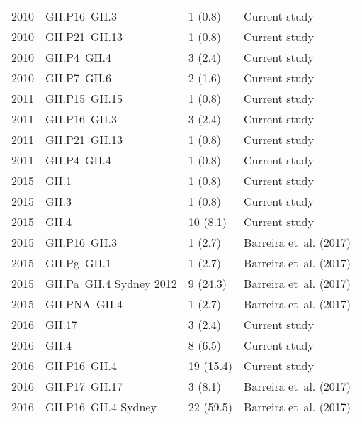 \begin{table}[htbp]
\begin{tabular}{p{0.6cm}p{3.2cm}p{1.8cm}p{2.5cm}}
		2010          & GII.P16~GII.3                       & 1 (0.8)                     & Current study          \\
		2010          & GII.P21~GII.13                      & 1 (0.8)                     & Current study          \\
		2010          & GII.P4~GII.4                        & 3 (2.4)                     & Current study          \\
		2010          & GII.P7~GII.6                        & 2 (1.6)                     & Current study          \\
		2011          & GII.P15~GII.15                      & 1 (0.8)                     & Current study          \\
		2011          & GII.P16~GII.3                       & 3 (2.4)                     & Current study          \\
		2011          & GII.P21~GII.13                      & 1 (0.8)                     & Current study          \\
		2011          & GII.P4~GII.4                        & 1 (0.8)                     & Current study          \\
		2015          & GII.1                               & 1 (0.8)                     & Current study          \\
		2015          & GII.3                               & 1 (0.8)                     & Current study          \\
		2015          & GII.4                               & 10 (8.1)                    & Current study          \\
		2015          & GII.P16~GII.3                       & 1 (2.7)                     & Barreira et~al. (2017) \\
		2015          & GII.Pg~GII.1                        & 1 (2.7)                     & Barreira et~al. (2017) \\
		2015          & GII.Pa~GII.4 Sydney 2012            & 9 (24.3)                    & Barreira et~al. (2017) \\
		2015          & GII.PNA~GII.4                       & 1 (2.7)                     & Barreira et~al. (2017) \\
		2016          & GII.17                              & 3 (2.4)                     & Current study          \\
		2016          & GII.4                               & 8 (6.5)                     & Current study          \\
		2016          & GII.P16~GII.4                       & 19 (15.4)                   & Current study          \\
		2016          & GII.P17~GII.17                      & 3 (8.1)                     & Barreira et~al. (2017) \\
		2016          & GII.P16~GII.4 Sydney                & 22 (59.5)                   & Barreira et~al. (2017) \\
		\bottomrule
	\end{tabular}
	\label{tab:sup_norovirus_strains_extended}
\end{table}

